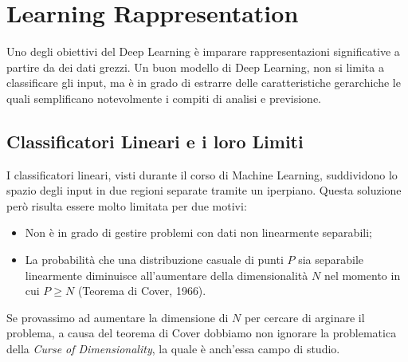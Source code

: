 \chapter{Learning Rappresentation}
Uno degli obiettivi del Deep Learning è imparare rappresentazioni significative a partire da dei dati grezzi. Un buon modello di Deep Learning, non si limita a classificare gli input, ma è in grado di estrarre delle caratteristiche gerarchiche le quali semplificano notevolmente i compiti di analisi e previsione.

\section{Classificatori Lineari e i loro Limiti}
I classificatori lineari, visti durante il corso di Machine Learning, suddividono lo spazio degli input in due regioni separate tramite un iperpiano. Questa soluzione però risulta essere molto limitata per due motivi:
\begin{itemize}
    \item Non è in grado di gestire problemi con dati non linearmente separabili;
    \item La probabilità che una distribuzione casuale di punti $P$ sia separabile linearmente diminuisce all'aumentare della dimensionalità $N$ nel momento in cui $P \ge N$ (Teorema di Cover, 1966).
\end{itemize}

Se provassimo ad aumentare la dimensione di $N$ per cercare di arginare il problema, a causa del teorema di Cover dobbiamo non ignorare la problematica della \textit{Curse of Dimensionality}, la quale è anch'essa campo di studio.

